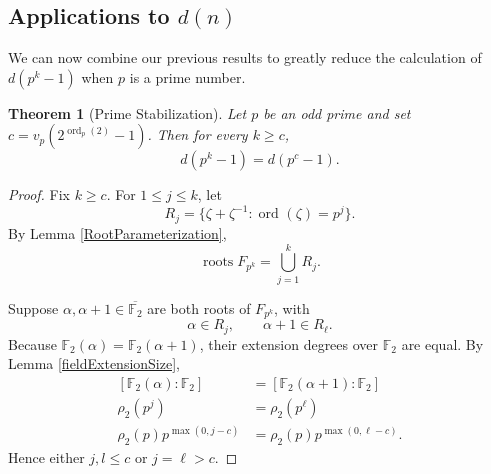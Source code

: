 \documentclass[a4paper]{article}
\newtheorem{theorem}{Theorem}[section]
\newcommand{\F}{\mathbb{F}}
\newcommand{\ord}[2][]{\operatorname{ord}_{#1}\!\left( #2 \right)}
\begin{document}
	\subsection{Applications to $d(n)$}
	We can now combine our previous results to greatly reduce the calculation of $d(p^k - 1)$ when $p$ is a prime number.
	\begin{theorem}[Prime Stabilization]\label{primePowerStabilization}
		Let $p$ be an odd prime and set $c = v_p(2^{\ord[p]{2}} - 1)$.
		Then for every $k \geq c$,
		\begin{equation*}
			d(p^k - 1) = d(p^c - 1).
		\end{equation*}
	\end{theorem}
	\begin{proof}
		Fix $k \geq c$.
		For $1 \leq j \leq k$, let
		\begin{equation*}
			R_j = \{\zeta + \zeta^{-1} : \ord{\zeta} = p^j\}.
		\end{equation*}
		By Lemma \ref{RootParameterization},
		\begin{equation*}
			\operatorname{roots}{F_{p^k}} = \bigcup_{j=1}^{k}{R_j}.
		\end{equation*}
	
		Suppose $\alpha, \alpha+1 \in \overline{\F_2}$ are both roots of $F_{p^k}$, with
		\begin{equation*}
			\alpha \in R_j, \qquad \alpha+1 \in R_\ell.
		\end{equation*}
		Because $\F_2(\alpha) = \F_2(\alpha+1)$, their extension degrees over $\F_2$ are equal.
		By Lemma \ref{fieldExtensionSize},
		\begin{align*}
			\left[\F_2(\alpha) : \F_2\right] &= \left[\F_2(\alpha+1) : \F_2\right] \\
			\rho_2(p^j) &= \rho_2(p^\ell) \\
			\rho_2(p) p^{\max{(0,j-c)}} &= \rho_2(p) p^{\max{(0, \ell-c)}}.
		\end{align*}
		Hence either $j,l \leq c$ or $j = \ell > c$.
		

\end{proof}
\end{document}
